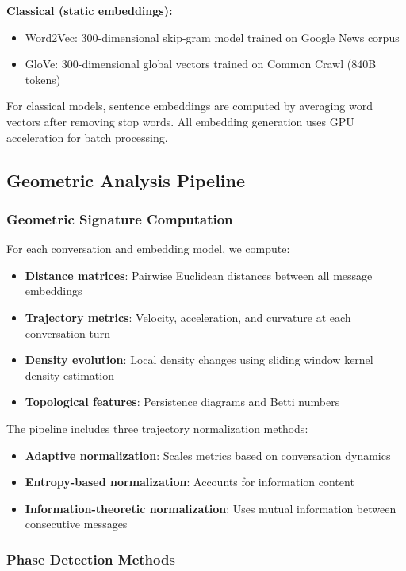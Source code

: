 \documentclass[11pt,letterpaper]{article}
\begin{document}
\textbf{Classical (static embeddings):}
\begin{itemize}
\item Word2Vec: 300-dimensional skip-gram model trained on Google News corpus
\item GloVe: 300-dimensional global vectors trained on Common Crawl (840B tokens)
\end{itemize}

For classical models, sentence embeddings are computed by averaging word vectors after removing stop words. All embedding generation uses GPU acceleration for batch processing.

\subsection{Geometric Analysis Pipeline}

\subsubsection{Geometric Signature Computation}

For each conversation and embedding model, we compute:
\begin{itemize}
\item \textbf{Distance matrices}: Pairwise Euclidean distances between all message embeddings
\item \textbf{Trajectory metrics}: Velocity, acceleration, and curvature at each conversation turn
\item \textbf{Density evolution}: Local density changes using sliding window kernel density estimation
\item \textbf{Topological features}: Persistence diagrams and Betti numbers
\end{itemize}

The pipeline includes three trajectory normalization methods:
\begin{itemize}
\item \textbf{Adaptive normalization}: Scales metrics based on conversation dynamics
\item \textbf{Entropy-based normalization}: Accounts for information content
\item \textbf{Information-theoretic normalization}: Uses mutual information between consecutive messages
\end{itemize}

\subsubsection{Phase Detection Methods}
\end{document}
